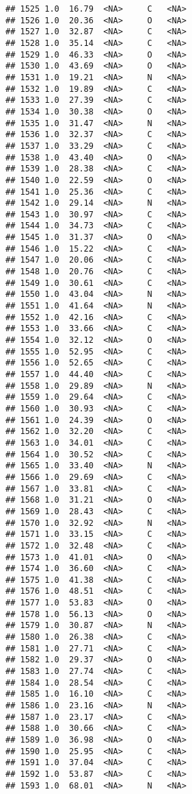 \documentclass[
]{article}
\begin{document}
\begin{verbatim}
## 1525 1.0  16.79  <NA>     C   <NA>
## 1526 1.0  20.36  <NA>     O   <NA>
## 1527 1.0  32.87  <NA>     C   <NA>
## 1528 1.0  35.14  <NA>     C   <NA>
## 1529 1.0  46.33  <NA>     O   <NA>
## 1530 1.0  43.69  <NA>     O   <NA>
## 1531 1.0  19.21  <NA>     N   <NA>
## 1532 1.0  19.89  <NA>     C   <NA>
## 1533 1.0  27.39  <NA>     C   <NA>
## 1534 1.0  30.38  <NA>     O   <NA>
## 1535 1.0  31.47  <NA>     N   <NA>
## 1536 1.0  32.37  <NA>     C   <NA>
## 1537 1.0  33.29  <NA>     C   <NA>
## 1538 1.0  43.40  <NA>     O   <NA>
## 1539 1.0  28.38  <NA>     C   <NA>
## 1540 1.0  22.59  <NA>     O   <NA>
## 1541 1.0  25.36  <NA>     C   <NA>
## 1542 1.0  29.14  <NA>     N   <NA>
## 1543 1.0  30.97  <NA>     C   <NA>
## 1544 1.0  34.73  <NA>     C   <NA>
## 1545 1.0  31.37  <NA>     O   <NA>
## 1546 1.0  15.22  <NA>     C   <NA>
## 1547 1.0  20.06  <NA>     C   <NA>
## 1548 1.0  20.76  <NA>     C   <NA>
## 1549 1.0  30.61  <NA>     C   <NA>
## 1550 1.0  43.04  <NA>     N   <NA>
## 1551 1.0  41.64  <NA>     N   <NA>
## 1552 1.0  42.16  <NA>     C   <NA>
## 1553 1.0  33.66  <NA>     C   <NA>
## 1554 1.0  32.12  <NA>     O   <NA>
## 1555 1.0  52.95  <NA>     C   <NA>
## 1556 1.0  52.65  <NA>     C   <NA>
## 1557 1.0  44.40  <NA>     C   <NA>
## 1558 1.0  29.89  <NA>     N   <NA>
## 1559 1.0  29.64  <NA>     C   <NA>
## 1560 1.0  30.93  <NA>     C   <NA>
## 1561 1.0  24.39  <NA>     O   <NA>
## 1562 1.0  32.20  <NA>     C   <NA>
## 1563 1.0  34.01  <NA>     C   <NA>
## 1564 1.0  30.52  <NA>     C   <NA>
## 1565 1.0  33.40  <NA>     N   <NA>
## 1566 1.0  29.69  <NA>     C   <NA>
## 1567 1.0  33.81  <NA>     C   <NA>
## 1568 1.0  31.21  <NA>     O   <NA>
## 1569 1.0  28.43  <NA>     C   <NA>
## 1570 1.0  32.92  <NA>     N   <NA>
## 1571 1.0  33.15  <NA>     C   <NA>
## 1572 1.0  32.48  <NA>     C   <NA>
## 1573 1.0  41.01  <NA>     O   <NA>
## 1574 1.0  36.60  <NA>     C   <NA>
## 1575 1.0  41.38  <NA>     C   <NA>
## 1576 1.0  48.51  <NA>     C   <NA>
## 1577 1.0  53.83  <NA>     O   <NA>
## 1578 1.0  56.13  <NA>     O   <NA>
## 1579 1.0  30.87  <NA>     N   <NA>
## 1580 1.0  26.38  <NA>     C   <NA>
## 1581 1.0  27.71  <NA>     C   <NA>
## 1582 1.0  29.37  <NA>     O   <NA>
## 1583 1.0  27.74  <NA>     C   <NA>
## 1584 1.0  28.54  <NA>     C   <NA>
## 1585 1.0  16.10  <NA>     C   <NA>
## 1586 1.0  23.16  <NA>     N   <NA>
## 1587 1.0  23.17  <NA>     C   <NA>
## 1588 1.0  30.66  <NA>     C   <NA>
## 1589 1.0  36.98  <NA>     O   <NA>
## 1590 1.0  25.95  <NA>     C   <NA>
## 1591 1.0  37.04  <NA>     C   <NA>
## 1592 1.0  53.87  <NA>     C   <NA>
## 1593 1.0  68.01  <NA>     N   <NA>

\end{verbatim}
\end{document}
